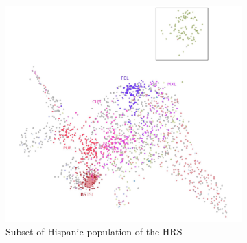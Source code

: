 \documentclass[12pt]{pnas-new}
\begin{document}
\begin{figure}
    \centering
    \begin{subfigure}{0.5\columnwidth}
    \includegraphics[width=\columnwidth]{images/HRS_1000G_NP1_UMAP_PC7_NC2_NN15_MD05_pca_hrshisp_added1kgp_2018115153245_1kgp_hisp.pdf}
    \caption{Subset of Hispanic population of the HRS}
    \label{fig:supp_umap_hrs_hisp_1kgp_hisp}
    \end{subfigure}\hfill
        \begin{subfigure}{0.5\columnwidth}

\end{subfigure}
\end{figure}
\end{document}
